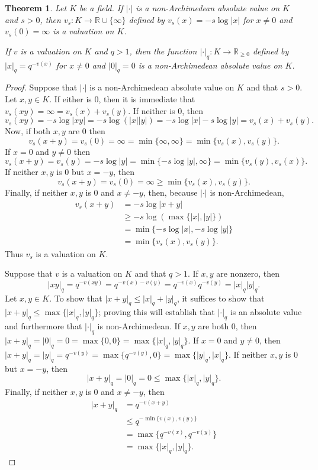 \documentclass{article}
\newtheorem{theorem}{Theorem}
\theoremstyle{definition}
\begin{document}
\begin{theorem}
Let $K$ be a field. If $|\cdot|$  is a non-Archimedean absolute value on $K$
 and $s>0$, then $v_s:K \to \mathbb{R} \cup \{\infty\}$ defined by
 $v_s(x)=-s \log |x|$ for $x \neq 0$ and $v_s(0)=\infty$ is a valuation on $K$.
 
 If $v$ is a valuation on $K$ and $q>1$, then the function $|\cdot|_q:K \to \mathbb{R}_{\geq 0}$ defined by
 $|x|_q=q^{-v(x)}$ for $x \neq 0$ and $|0|_q=0$ is a non-Archimedean absolute value on $K$.
\end{theorem}
\begin{proof}
Suppose that $|\cdot|$ is a non-Archimedean absolute value on $K$ and that $s>0$. 
Let $x,y \in K$. If either is $0$, then it is immediate that $v_s(xy)=\infty=v_s(x)+v_s(y)$. 
If neither is $0$, then
\[
v_s(xy)=-s \log |xy| = -s \log(|x||y|)
=-s\log|x|-s\log|y|=v_s(x)+v_s(y).
\]
Now, if both $x,y$ are $0$ then
\[
v_s(x+y)=v_s(0)=\infty = \min\{\infty,\infty\} = \min\{v_s(x),v_s(y)\}.
\]
If $x=0$ and $y \neq 0$ then
\[
v_s(x+y)=v_s(y)=-s\log|y| = \min\{-s\log|y|,\infty\}=\min\{v_s(y),v_s(x)\}.
\]
If neither $x,y$ is $0$ but $x = -y$, then
\[
v_s(x+y)=v_s(0)=\infty \geq \min\{v_s(x),v_s(y)\}.
\]
Finally, if neither $x,y$ is $0$ and $x \neq -y$, then, because $|\cdot|$ is non-Archimedean,
\begin{align*}
v_s(x+y)&=-s\log|x+y|\\
&\geq -s\log (\max\{|x|,|y|\})\\
&=\min\{-s\log|x|,-s\log|y|\}\\
&=\min\{v_s(x),v_s(y)\}.
\end{align*}
Thus $v_s$ is a valuation on $K$.

Suppose that $v$ is a valuation on $K$ and that $q>1$. If $x,y$ are nonzero, then 
\[
|xy|_q=q^{-v(xy)} = q^{-v(x)-v(y)}=q^{-v(x)} q^{-v(y)} = |x|_q |y|_q.
\]
Let $x,y \in K$. To show that $|x+y|_q \leq |x|_q + |y|_q$, it suffices to show that
$|x+y|_q \leq \max\{|x|_q,|y|_q\}$; proving this will establish that $|\cdot|_q$ is an absolute value and furthermore
that $|\cdot|_q$ is non-Archimedean. If $x,y$ are both $0$, then
$|x+y|_q=|0|_q = 0 = \max\{0,0\}=\max\{|x|_q,|y|_q\}$. If $x =0$ and $y \neq 0$, then
$|x+y|_q=|y|_q = q^{-v(y)} = \max\{q^{-v(y)},0\}=\max\{|y|_q,|x|_q\}$. If neither $x,y$ is $0$ but
$x=-y$, then
\[
|x+y|_q=|0|_q=0 \leq \max\{|x|_q,|y|_q\}.
\]
Finally, if neither $x,y$ is $0$ and $x \neq -y$, then
\begin{align*}
|x+y|_q&=q^{-v(x+y)}\\
&\leq q^{-\min\{v(x),v(y)\}}\\
&=\max\{q^{-v(x)},q^{-v(y)}\}\\
&=\max\{|x|_q,|y|_q\}.
\end{align*}
\end{proof}
\end{document}
